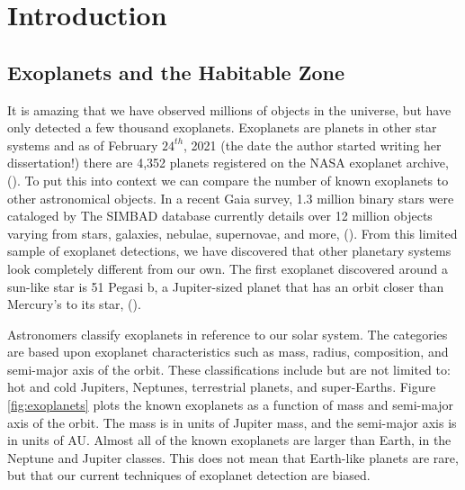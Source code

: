 \chapter{Introduction}\label{CH1}

 



\section{Exoplanets and the Habitable Zone}

 It is amazing that we have observed millions of objects in the universe, but have only detected a few thousand exoplanets. Exoplanets are planets in other star systems and as of February $24^{th}$, 2021 (the date the author started writing her dissertation!) there are 4,352 planets registered on the NASA exoplanet archive, (\cite{akeson2013nasa}). To put this into context we can compare the number of known exoplanets to other astronomical objects. In a recent Gaia survey, 1.3 million binary stars were cataloged by \cite{el2101million} The SIMBAD database currently details over 12 million objects varying from stars, galaxies, nebulae, supernovae, and more, (\cite{wenger2000simbad}). From this limited sample of exoplanet detections, we have discovered that other planetary systems look completely different from our own. The first exoplanet discovered around a sun-like star is 51 Pegasi b, a Jupiter-sized planet that has an orbit closer than Mercury's to its star, (\cite{mayor1995jupiter}). 

 Astronomers classify exoplanets in reference to our solar system. The categories are based upon exoplanet characteristics such as mass, radius, composition, and semi-major axis of the orbit. These classifications include but are not limited to: hot and cold Jupiters, Neptunes, terrestrial planets, and super-Earths. Figure \ref{fig:exoplanets} plots the known exoplanets as a function of mass and semi-major axis of the orbit. The mass is in units of Jupiter mass, and the semi-major axis is in units of AU. Almost all of the known exoplanets are larger than Earth, in the Neptune and Jupiter classes. This does not mean that Earth-like planets are rare, but that our current techniques of exoplanet detection are biased.

